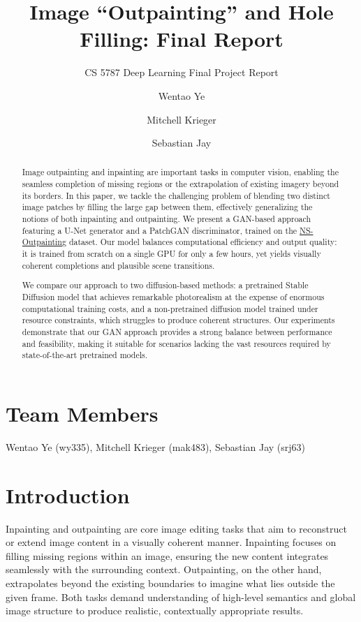 \documentclass[sigconf]{acmart}
\title{Image “Outpainting” and Hole Filling: Final Report}
\subtitle{CS 5787 Deep Learning Final Project Report}
\author{Wentao Ye}
\affiliation{%
  \institution{Cornell University}
  \city{New York}
  \state{New York}
  \country{USA}
}
\author{Mitchell Krieger}
\affiliation{%
  \institution{Cornell University}
  \city{New York}
  \state{New York}
  \country{USA}
}
\author{Sebastian Jay}
\affiliation{%
  \institution{Cornell University}
  \city{New York}
  \state{New York}
  \country{USA}
}
\begin{document}
\begin{abstract}
    Image outpainting and inpainting are important tasks in computer vision, enabling the seamless completion of missing regions or the extrapolation of existing imagery beyond its borders. In this paper, we tackle the challenging problem of blending two distinct image patches by filling the large gap between them, effectively generalizing the notions of both inpainting and outpainting. We present a GAN-based approach featuring a U-Net generator and a PatchGAN discriminator, trained on the \textcolor{red}{\href{https://github.com/z-x-yang/NS-Outpainting}{NS-Outpainting}} dataset. Our model balances computational efficiency and output quality: it is trained from scratch on a single GPU for only a few hours, yet yields visually coherent completions and plausible scene transitions.
    
    We compare our approach to two diffusion-based methods: a pretrained Stable Diffusion model that achieves remarkable photorealism at the expense of enormous computational training costs, and a non-pretrained diffusion model trained under resource constraints, which struggles to produce coherent structures. Our experiments demonstrate that our GAN approach provides a strong balance between performance and feasibility, making it suitable for scenarios lacking the vast resources required by state-of-the-art pretrained models.
\end{abstract}

\maketitle

\section*{Team Members}
Wentao Ye (wy335), Mitchell Krieger (mak483), Sebastian Jay (srj63)


\section{Introduction}
Inpainting and outpainting are core image editing tasks that aim to reconstruct or extend image content in a visually coherent manner. Inpainting focuses on filling missing regions within an image, ensuring the new content integrates seamlessly with the surrounding context. Outpainting, on the other hand, extrapolates beyond the existing boundaries to imagine what lies outside the given frame. Both tasks demand understanding of high-level semantics and global image structure to produce realistic, contextually appropriate results.
\end{document}
